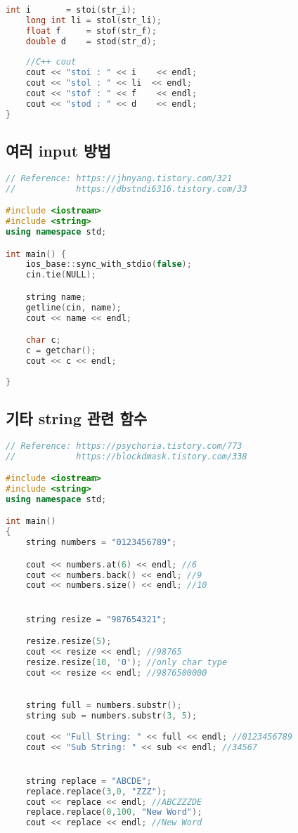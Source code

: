 \documentclass[]{article}
\begin{document}
\begin{multicols*}{2}
\begin{lstlisting}[language=c++]
    int i       = stoi(str_i);
    long int li = stol(str_li);
    float f     = stof(str_f);
    double d    = stod(str_d);
 
    //C++ cout
    cout << "stoi : " << i    << endl;
    cout << "stol : " << li  << endl;
    cout << "stof : " << f    << endl;
    cout << "stod : " << d    << endl;
}
\end{lstlisting}
\subsection{여러 input 방법}
\begin{lstlisting}[language=c++]
// Reference: https://jhnyang.tistory.com/321
//            https://dbstndi6316.tistory.com/33

#include <iostream>
#include <string>
using namespace std;

int main() {
    ios_base::sync_with_stdio(false);
    cin.tie(NULL);

    string name;
    getline(cin, name);
    cout << name << endl;

    char c;
    c = getchar();
    cout << c << endl;
    
}
\end{lstlisting}
\subsection{기타 string 관련 함수}
\begin{lstlisting}[language=c++]
// Reference: https://psychoria.tistory.com/773
//            https://blockdmask.tistory.com/338

#include <iostream>
#include <string>
using namespace std;

int main()
{
    string numbers = "0123456789";

    cout << numbers.at(6) << endl; //6
    cout << numbers.back() << endl; //9
    cout << numbers.size() << endl; //10


    string resize = "987654321";

    resize.resize(5);
    cout << resize << endl; //98765
    resize.resize(10, '0'); //only char type
    cout << resize << endl; //9876500000
		

    string full = numbers.substr();
    string sub = numbers.substr(3, 5);
    
    cout << "Full String: " << full << endl; //0123456789
    cout << "Sub String: " << sub << endl; //34567


    string replace = "ABCDE";
    replace.replace(3,0, "ZZZ");
    cout << replace << endl; //ABCZZZDE
    replace.replace(0,100, "New Word");
    cout << replace << endl; //New Word



\end{lstlisting}
\end{multicols*}
\end{document}
